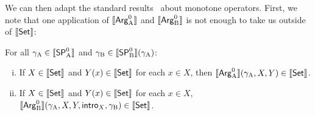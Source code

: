 \documentclass{article}
\begin{document}




We can then adapt the standard results~\cite{aczel1977indDef} about
monotone operators. First, we note that one application of
$\sem{\ArgAp}$ and $\sem{\ArgBp}$ is not enough to take us outside of
$\sem{\Set}$:


\begin{lemma}
  For all $\gammaA \in \sem{\SPAp}$ and $\gammaB \in \sem{\SPBp}(\gammaA)$:
  \begin{enumerate}[(i)]
  \item If $X \in \sem{\Set}$ and $Y(x) \in \sem{\Set}$ for each $x \in X$, then $\sem{\ArgAp}(\gammaA, X, Y) \in \sem{\Set}$.
  \item If $X \in \sem{\Set}$ and $Y(x) \in \sem{\Set}$ for each $x \in X$,  $\sem{\ArgBp}(\gammaA, X, Y, \intro{X}, \gammaB) \in \sem{\Set}$.
  \end{enumerate}
  \end{lemma}
\end{document}
